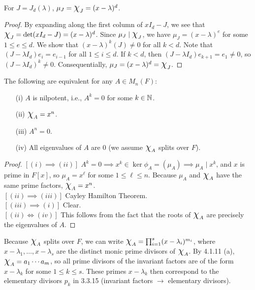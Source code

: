 \documentclass[11pt]{book}
\theoremstyle{definition}   \newtheorem{defn}[counter]{Definition} %
\newcommand{\Chi}{\mbox{\Large $\chi$}}
\DeclareMathOperator{\ra}{\rightarrow}   \DeclareMathOperator{\Poly}{\mathbf{P}}   \DeclareMathOperator{\spn}{\textnormal{span}}   \DeclareMathOperator{\aut}{\textnormal{Aut}}
\newcommand{\vs}{\vspace{8pt}}   \newcommand{\hs}{\hspace{8pt}}
\numberwithin{counter}{chapter}
\begin{document}
\vs

\begin{lemma}
For $J = J_d(\lambda)$, $\mu_J = \Chi_J = (x-\lambda)^d$.
\end{lemma}

\begin{proof}
By expanding along the first column of $xI_d - J$, we see that $\Chi_J = \det(xI_d - J) = (x-\lambda)^d$. Since $\mu_J \mid \Chi_J$, we have $\mu_J = (x-\lambda)^e$ for some $1 \leq e \leq d$. We show that $(x-\lambda)^k(J) \ne 0$ for all $k < d$. Note that $(J-\lambda I_d)e_i = e_{i-1}$ for all $1 \leq i \leq d$. If $k < d$, then $(J-\lambda I_d)e_{k+1} = e_1 \ne 0$, so $(J-\lambda I_d)^k \ne 0$. Consequentially, $\mu_J = (x-\lambda)^d = \Chi_J$. 
\end{proof}

\vs

\begin{lemma}
The following are equivalent for any $A \in M_n(F)$:
\begin{enumerate}
\item[(i)] $A$ is nilpotent, i.e., $A^k = 0$ for some $k \in \operatorname{\mathbb{N}}$. 
\item[(ii)] $\Chi_A = x^n$.
\item[(iii)] $A^n = 0$.
\item[(iv)] All eigenvalues of $A$ are 0 (we assume $\Chi_A$ splits over $F$). 
\end{enumerate}
\end{lemma}

\begin{proof}
$[(i) \implies (ii)]$ $A^k = 0 \implies x^k \in \ker \phi_A = (\mu_A) \implies \mu_A \mid x^k$, and $x$ is prime in $F[x]$, so $\mu_A = x^\ell$ for some $1 \leq \ell \leq n$. Because $\mu_A$ and $\Chi_A$ have the same prime factors, $\Chi_A = x^n$. \\

$[(ii) \implies (iii)]$ Cayley Hamilton Theorem. \\

$[(iii) \implies (i)]$ Clear. \\

$[(ii) \iff (iv)]$ This follows from the fact that the roots of $\Chi_A$ are precisely the eigenvalues of $A$. 
\end{proof}

\vs

Because $\Chi_A$ splits over $F$, we can write $\Chi_A = \prod_{i=1}^s (x-\lambda_i)^{m_i}$, where $x-\lambda_1,\dots,x-\lambda_s$ are the distinct monic prime divisors of $\Chi_A$. By 4.1.11 (a), $\Chi_A = a_1 \cdots a_m$, so all prime divisors of the invariant factors are of the form $x-\lambda_k$ for some $1 \leq k \leq s$. These primes $x-\lambda_k$ then correspond to the elementary divisors $p_k$ in 3.3.15 (invariant factors $\ra$ elementary divisors). \\
\end{document}
